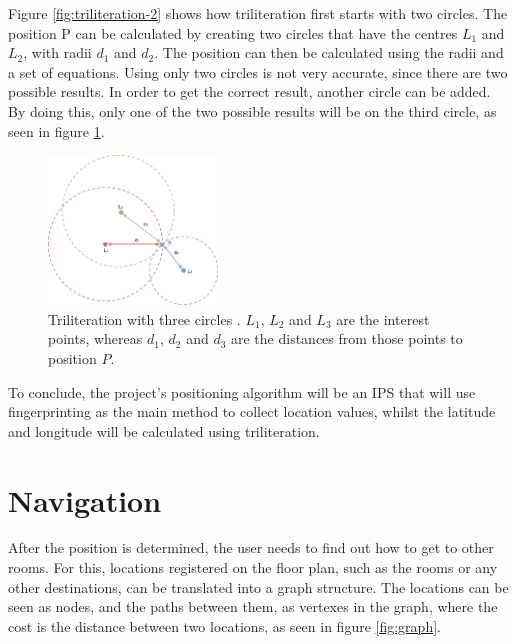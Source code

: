 Figure \ref{fig:triliteration-2} shows how triliteration first starts with two circles. The position P can be calculated by creating two circles that have the centres $L_1$ and $L_2$, with radii $d_1$ and $d_2$. The position can then be calculated using the radii and a set of equations. Using only two circles is not very accurate, since there are two possible results. In order to get the correct result, another circle can be added. By doing this, only one of the two possible results will be on the third circle, as seen in figure \ref{fig:triliteration-3}.

\begin{figure}[H]
    \centering
    \includegraphics[width=170px, height=150px]{res/Trilateration3.png}
    \centering
    \caption{Triliteration with three circles \cite{triliteration-image}. $L_1$, $L_2$ and $L_3$ are the interest points, whereas $d_1$, $d_2$ and $d_3$ are the distances from those points to position $P$.}
    \label{fig:triliteration-3}
\end{figure}


To conclude, the project's positioning algorithm will be an IPS that will use fingerprinting as the main method to collect location values, whilst the latitude and longitude will be calculated using triliteration.

\newpage
\section{Navigation}
After the position is determined, the user needs to find out how to get to other rooms. For this, locations registered on the floor plan, such as the rooms or any other destinations, can be translated into a graph structure. The locations can be seen as nodes, and the paths between them, as vertexes in the graph, where the cost is the distance between two locations, as seen in figure \ref{fig:graph}.

